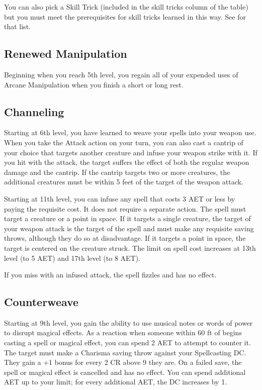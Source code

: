 You can also pick a Skill Trick (included in the skill tricks column of the  table) but you must meet the prerequisites for skill tricks learned in this way. See  for that list.

\subsection{Renewed Manipulation}

Beginning when you reach 5th level, you regain all of your expended uses of Arcane Manipulation when you finish a short or long rest.

\subsection{Channeling}
Starting at 6th level, you have learned to weave your spells into your weapon use. When you take the Attack action on your turn, you can also cast a cantrip of your choice that targets another creature and infuse your weapon strike with it. If you hit with the attack, the target suffers the effect of both the regular weapon damage and the cantrip. If the cantrip targets two or more creatures, the additional creatures must be within 5 feet of the target of the weapon attack.

Starting at 11th level, you can infuse any spell that costs 3 AET or less by paying the requisite cost. It does not require a separate action. The spell must target a creature or a point in space. If it targets a single creature, the target of your weapon attack is the target of the spell and must make any requisite saving throws, although they do so at disadvantage. If it targets a point in space, the target is centered on the creature struck. The limit on spell cost increases at 13th level (to 5 AET) and 17th level (to 8 AET).

If you miss with an infused attack, the spell fizzles and has no effect.

\subsection{Counterweave}

Starting at 9th level, you gain the ability to use musical notes or words of power to disrupt magical effects. As a reaction when someone within 60 ft of begins casting a spell or magical effect, you can spend 2 AET to attempt to counter it. The target must make a Charisma saving throw against your Spellcasting DC. They gain a +1 bonus for every 2 CR above 9 they are. On a failed save, the spell or magical effect is cancelled and has no effect. You can spend additional AET up to your limit; for every additional AET, the DC increases by 1.

